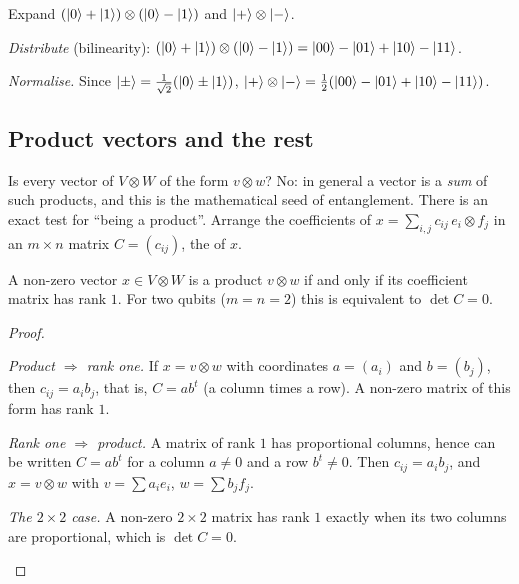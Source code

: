 \begin{example}\label{ex:tensor-bilinear}
  Expand $(\left|0\right\rangle+\left|1\right\rangle)\otimes(\left|0\right\rangle-\left|1\right\rangle)$ and $\left|+\right\rangle\otimes\left|-\right\rangle$.
\end{example}
\begin{solution}
  \begin{steps}
    \item \emph{Distribute} (bilinearity): $(\left|0\right\rangle+\left|1\right\rangle)\otimes(\left|0\right\rangle-\left|1\right\rangle)=\left|00\right\rangle-\left|01\right\rangle+\left|10\right\rangle-\left|11\right\rangle$.
    \item \emph{Normalise.} Since $\left|\pm\right\rangle=\frac1{\sqrt2}(\left|0\right\rangle\pm\left|1\right\rangle)$, $\left|+\right\rangle\otimes\left|-\right\rangle=\tfrac12(\left|00\right\rangle-\left|01\right\rangle+\left|10\right\rangle-\left|11\right\rangle)$.
  \end{steps}
\end{solution}

\subsection{Product vectors and the rest}

Is every vector of $V\otimes W$ of the form $v\otimes w$? No: in general a vector is a \emph{sum} of such products, and this is the mathematical seed of entanglement. There is an exact test for ``being a product''. Arrange the coefficients of $x=\sum_{i,j}c_{ij}\,e_i\otimes f_j$ in an $m\times n$ matrix $C=(c_{ij})$, the  of $x$.

\begin{theorem}\label{thm:entangled-criterion}
  A non-zero vector $x\in V\otimes W$ is a product $v\otimes w$ if and only if its coefficient matrix has rank $1$. For two qubits ($m=n=2$) this is equivalent to $\det C=0$.
\end{theorem}
\begin{proof}
  \begin{steps}
    \item \emph{Product $\Rightarrow$ rank one.} If $x=v\otimes w$ with coordinates $a=(a_i)$ and $b=(b_j)$, then $c_{ij}=a_ib_j$, that is, $C=ab^t$ (a column times a row). A non-zero matrix of this form has rank $1$.
    \item \emph{Rank one $\Rightarrow$ product.} A matrix of rank $1$ has proportional columns, hence can be written $C=ab^t$ for a column $a\neq0$ and a row $b^t\neq0$. Then $c_{ij}=a_ib_j$, and $x=v\otimes w$ with $v=\sum a_ie_i$, $w=\sum b_jf_j$.
    \item \emph{The $2\times2$ case.} A non-zero $2\times2$ matrix has rank $1$ exactly when its two columns are proportional, which is $\det C=0$. \qedhere
  \end{steps}
\end{proof}

